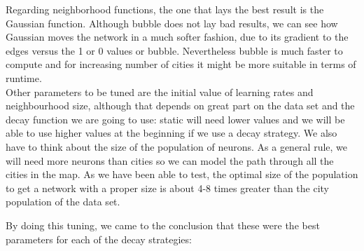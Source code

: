 \documentclass[11pt]{article}
\begin{document}
Regarding neighborhood functions, the one that lays the best result is the
Gaussian function. Although bubble does not lay bad results, we can see how
Gaussian moves the network in a much softer fashion, due to its gradient to the
edges versus the 1 or 0 values or bubble. Nevertheless bubble is much faster to
compute and for increasing number of cities it might be more suitable in terms
of runtime.\\

Other parameters to be tuned are the initial value of learning rates and
neighbourhood size, although that depends on great part on the data set and the
decay function we are going to use: static will need lower values and we will be
able to use higher values at the beginning if we use a decay strategy. We also
have to think about the size of the population of neurons. As a general rule, we
will need more neurons than cities so we can model the path through all the
cities in the map. As we have been able to test, the optimal size of the
population to get a network with a proper size is about 4-8 times greater than
the city population of the data set.\\

\newpage

By doing this tuning, we came to the conclusion that these were the best parameters for each of the decay strategies:
\end{document}
